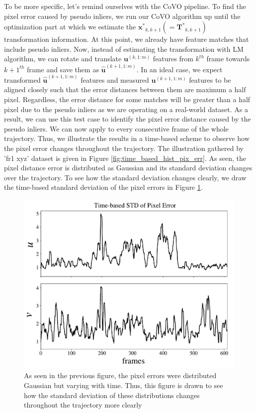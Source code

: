 \documentclass[12pt]{report}
\numberwithin{figure}{section}
\begin{document}
To be more specific, let's remind ourselves with the CoVO pipeline.  To find 
the pixel error caused by pseudo inliers, we run our CoVO algorithm up until 
the optimization part at which we estimate the 
$\mathbf{x^*}_{k,k+1}(=\mathbf{T^*}_{k,k+1})$ transformation information.  At 
this point, we already have feature matches that include pseudo inliers.  Now, 
instead of estimating the transformation with LM algorithm, we can rotate 
and translate $\mathbf{u}^{(k,1:m)}$ features from $k^{th}$ frame towards 
$k+1^{th}$ frame and save them as $\mathbf{\hat{u}}^{(k+1,1:m)}$.  In an ideal 
case, we expect transformed $\mathbf{\hat{u}}^{(k+1,1:m)}$ features and 
measured $\mathbf{u}^{(k+1,1:m)}$ features to be aligned closely such that the 
error distances between them are maximum a half pixel.  Regardless, the error 
distance for some matches will be greater than a half pixel due to the pseudo 
inliers as we are operating on a real-world dataset.  As a result, we can use 
this test case to identify the pixel error distance caused by the pseudo 
inliers.  We can now apply to every consecutive frame of the whole 
trajectory.  Thus, we illustrate the results in a time-based scheme to observe 
how the pixel error changes throughout the trajectory. The illustration 
gathered by 'fr1 xyz' dataset is given in Figure 
\ref{fig:time_based_hist_pix_err}.  As seen, the pixel distance error is 
distributed as Gaussian and its standard deviation changes over the 
trajectory.  To see how the standard deviation changes clearly, we draw the 
time-based standard deviation of the pixel errors in Figure 
\ref{fig:time_based_std_pix_err}.


\begin{figure}[H] \centering 
\includegraphics[width=0.8\linewidth,natwidth=640,natheight=640] 
{fig/eva_graphs/tum_fr1_xyz_tbased_uv_err_std.pdf} \caption[The Standard 
Deviations of Pixel Errors] {As seen in the previous figure, the pixel errors 
were distributed Gaussian but varying with time. Thus, this figure is drawn to 
see how the standard deviation of these distributions changes throughout the 
trajectory more clearly }\label{fig:time_based_std_pix_err} \end{figure}
\end{document}
